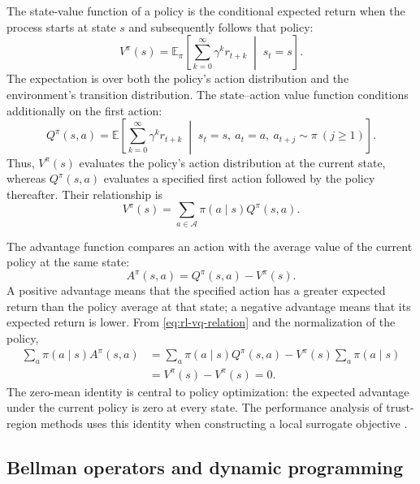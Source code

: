 The state-value function of a policy is the conditional expected return when
the process starts at state $s$ and subsequently follows that policy:
\begin{equation}
    V^\pi(s)
    =\mathbb{E}_{\pi}\!\left[
    \sum_{k=0}^{\infty}\gamma^k r_{t+k}
    \;\middle|\;s_t=s\right].
    \label{eq:rl-state-value}
\end{equation}
The expectation is over both the policy's action distribution and the
environment's transition distribution. The state--action value function
conditions additionally on the first action:
\begin{equation}
    Q^\pi(s,a)
    =\mathbb{E}\!\left[
    \sum_{k=0}^{\infty}\gamma^k r_{t+k}
    \;\middle|\;s_t=s,\ a_t=a,\ a_{t+j}\sim\pi\ (j\geq1)
    \right].
    \label{eq:rl-action-value}
\end{equation}
Thus, $V^\pi(s)$ evaluates the policy's action distribution at the current
state, whereas $Q^\pi(s,a)$ evaluates a specified first action followed by the
policy thereafter. Their relationship is
\begin{equation}
    V^\pi(s)
    =\sum_{a\in\mathcal{A}}\pi(a\mid s)Q^\pi(s,a).
    \label{eq:rl-vq-relation}
\end{equation}

The advantage function compares an action with the average value of the current
policy at the same state:
\begin{equation}
    A^\pi(s,a)=Q^\pi(s,a)-V^\pi(s).
    \label{eq:rl-advantage}
\end{equation}
A positive advantage means that the specified action has a greater expected
return than the policy average at that state; a negative advantage means that
its expected return is lower. From \cref{eq:rl-vq-relation} and the
normalization of the policy,
\begin{align}
    \sum_a\pi(a\mid s)A^\pi(s,a)
    &=\sum_a\pi(a\mid s)Q^\pi(s,a)
      -V^\pi(s)\sum_a\pi(a\mid s)\\
    &=V^\pi(s)-V^\pi(s)=0.
    \label{eq:rl-zero-mean-advantage}
\end{align}
The zero-mean identity is central to policy optimization: the expected
advantage under the current policy is zero at every state. The performance
analysis of trust-region methods uses this identity when constructing a local
surrogate objective \parencite{schulman2015trpo}.

\subsection{Bellman operators and dynamic programming}
\label{subsec:rl-bellman-dynamic-programming}


